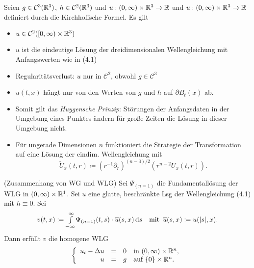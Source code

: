 \documentclass{cheat-sheet}
\begin{document}
\begin{satz}
  Seien $g \in \mathcal{C}^3(\mathbb{R}^3)$, $h \in \mathcal{C}^2(\mathbb{R}^3)$ und $u : \left( 0, \infty \right) \times \mathbb{R}^3 \to \mathbb{R}$ und $u : \left( 0, \infty \right) \times \mathbb{R}^3 \to \mathbb{R}$ definiert durch die Kirchhoffsche Formel. Es gilt
  \begin{itemize}
    \item $u \in \mathcal{C}^2(\left[ 0, \infty \right) \times \mathbb{R}^3)$
    \item $u$ ist die eindeutige Lösung der dreidimensionalen Wellengleichung mit Anfangswerten wie in (4.1)
  \end{itemize}
\end{satz}

\begin{bemn}
  \begin{itemize}
    \item Regularitätsverlust: $u$ nur in $\mathcal{C}^2$, obwohl $g \in \mathcal{C}^3$
    \item $u(t, x)$ hängt nur von den Werten von $g$ und $h$ auf $\partial B_t(x)$ ab.
    \item Somit gilt das \emph{Huygensche Prinzip}: Störungen der Anfangsdaten in der Umgebung eines Punktes ändern für große Zeiten die Lösung in dieser Umgebung nicht.
    \item Für ungerade Dimensionen $n$ funktioniert die Strategie der Transformation auf eine Lösung der eindim. Wellengleichung mit
    \[ \widetilde{U}_x(t, r) \coloneqq (r^{-1} \partial_r)^{(n-3)/2} (r^{n-2} U_x(t, r)). \]
  \end{itemize}
\end{bemn}

\begin{bem}(Zusammenhang von WG und WLG)
  Sei $\Psi_{(n=1)}$ die Fundamentallösung der WLG in $\left( 0, \infty \right) \times \mathbb{R}^1$. Sei $u$ eine glatte, beschränkte Lsg der Wellengleichung (4.1) mit $h \equiv 0$. Sei
  \[
    v(t, x) \coloneqq {\textstyle \int\limits_{-\infty}^{\infty}} \Psi_{(n=1)}(t, s) \cdot \overline{u}(s, x) \,\mathrm{d} s
    \quad \text{mit} \enspace \overline{u}(s, x) \coloneqq u(\lvert s\rvert, x).
  \]
  Dann erfüllt $v$ die homogene WLG
  \[
    \left\{ \begin{array}{rlll}
      u_t - \Delta u &=& 0 & \text{in $\left( 0, \infty \right) \times \mathbb{R}^n$},\\
      u &=& g & \text{auf $\{ 0 \} \times \mathbb{R}^n$}.
    \end{array} \right.
  \]
\end{bem}
\end{document}
